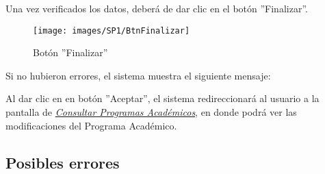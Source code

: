         Una vez verificados los datos, deberá de dar clic en el botón ''Finalizar''.
        \begin{figure}[!hbtp]
        	\centering
        	\hypertarget{btnfin}{\texttt{[image: images/SP1/BtnFinalizar]}}
        	\caption{Botón ''Finalizar''}
        	\label{btnfin}
        \end{figure}
        
        Si no hubieron errores, el sistema muestra el siguiente mensaje:
        
        Al dar clic en en botón ''Aceptar'', el sistema redireccionará al usuario a la pantalla de \hyperlink{consultarpa}{\textit{Consultar Programas Académicos}}, en donde podrá ver las modificaciones del Programa Académico.\\
        
        \subsection{Posibles errores}
    
